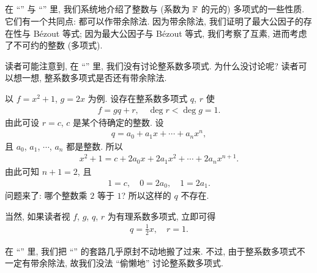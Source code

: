 \subsection*{\PolynomialsOverZAndOverQ}
\markright{\PolynomialsOverZAndOverQ}

在 ``\SomePropertiesOfIntegers '' 与 ``\SomePropertiesOfPolynomials '' 里, 我们系统地介绍了整数与 (系数为 $\mathbb{F}$ 的元的) 多项式的一些性质. 它们有一个共同点: 都可以作带余除法. 因为带余除法, 我们证明了最大公因子的存在性与 Bézout 等式; 因为最大公因子与 Bézout 等式, 我们考察了互素, 进而考虑了不可约的整数 (多项式).

读者可能注意到, 在 ``\SomePropertiesOfPolynomials '' 里, 我们没有讨论整系数多项式. 为什么没讨论呢? 读者可以想一想, 整系数多项式是否还有带余除法.

\begin{example}
    以 $f = x^2 + 1$, $g = 2x$ 为例. 设存在整系数多项式 $q$, $r$ 使
    \begin{align*}
        f = gq + r, \quad \deg r < \deg g = 1.
    \end{align*}
    由此可设 $r = c$, $c$ 是某个待确定的整数. 设
    \begin{align*}
        q = a_0 + a_1 x + \cdots + a_n x^n,
    \end{align*}
    且 $a_0$, $a_1$, $\cdots$, $a_n$ 都是整数. 所以
    \begin{align*}
        x^2 + 1 = c + 2a_0 x + 2a_1 x^2 + \cdots + 2a_n x^{n+1}.
    \end{align*}
    由此可知 $n+1 = 2$, 且
    \begin{align*}
        1 = c, \quad 0 = 2a_0, \quad 1 = 2a_1.
    \end{align*}
    问题来了: 哪个整数乘 $2$ 等于 $1$? 所以这样的 $q$ 不存在.

    当然, 如果读者视 $f$, $g$, $q$, $r$ 为有理系数多项式, 立即可得
    \begin{align*}
        q = \frac{1}{2}x, \quad r = 1.
    \end{align*}
\end{example}

在 ``\SomePropertiesOfPolynomials '' 里, 我们把 ``\SomePropertiesOfIntegers '' 的套路几乎原封不动地搬了过来. 不过, 由于整系数多项式不一定有带余除法, 故我们没法 ``偷懒地'' 讨论整系数多项式.

